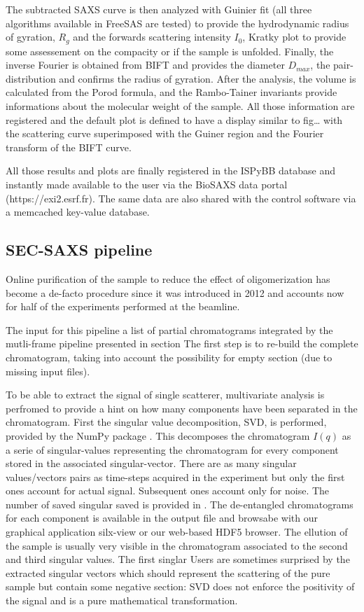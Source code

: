 \documentclass[preprint]{iucr}              %
\begin{document}
The subtracted SAXS curve is then analyzed with Guinier fit (all three algorithms available in FreeSAS are tested)
to provide the hydrodynamic radius of gyration, $R_g$ and the forwards scattering intensity $I_0$, 
Kratky plot to provide some assessement on the compacity or if the sample is unfolded. 
Finally, the inverse Fourier is obtained from BIFT and provides the diameter $D_{max}$, the pair-distribution 
and confirms the radius of gyration.
After the analysis, the volume is calculated from the Porod formula, and the Rambo-Tainer invariants provide 
informations about the molecular weight of the sample.
All those information are registered and the default plot is defined to have a display similar to fig\ldots
with the scattering curve superimposed with the Guiner region and the Fourier transform of the BIFT curve.

All those results and plots are finally registered in the ISPyBB database and instantly made available to the user via
the BioSAXS data portal (https://exi2.esrf.fr). 
The same data are also shared with the control software via a memcached key-value database.  
       

\subsection{SEC-SAXS pipeline}
Online purification of the sample to reduce the effect of oligomerization has become a de-facto procedure
since it was introduced in 2012 \cite{SECPaper2012} and accounts now for half of the experiments performed at the beamline.

The input for this pipeline a list of partial chromatograms integrated by the mutli-frame pipeline presented in section {}
The first step is to re-build the complete chromatogram, taking into account the possibility for empty section (due to missing input files).

To be able to extract the signal of single scatterer, multivariate analysis is perfromed to provide a hint on how many components
have been separated in the chromatogram. 
First the singular value decomposition, SVD, is performed, provided by the NumPy package \cite{numpy}.
This decomposes the chromatogram $I(q)$ as a serie of singular-values representing the chromatogram for every component stored in the
associated singular-vector. 
There are as many singular values/vectors pairs as time-steps acquired in the experiment but only the first ones account for actual signal.
Subsequent ones account only for noise. 
The number of saved singular saved is provided in \cite{svd_threshold}.
The de-entangled chromatograms for each component is available in the output file and browsabe with our graphical application silx-view or our web-based HDF5 browser.
The ellution of the sample is usually very visible in the chromatogram associated to the second and third singular values.
The first singlar  
Users are sometimes surprised by the extracted singular vectors which should represent the scattering of the pure sample 
but contain some negative section: SVD does not enforce the positivity of the signal and is a pure mathematical transformation.
\end{document}
